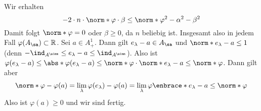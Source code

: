 \begin{beweis}
	Wir erhalten 
	\[
		- 2 \cdot n \cdot \norm*{\varphi} \cdot \beta \le \norm*{\varphi}^2 - \alpha^2 -\beta^2
	\]
	Damit folgt $\norm*{\varphi}= 0$ oder $\beta\ge 0$, da $n$ beliebig ist. 
	Insgesamt also in jedem Fall $\varphi(A_\sa) \subset \mathbb{R}$.
	Sei $a \in A_+^1$. Dann gilt $e_\lambda-a \in A_\sa$ und $\norm*{e_\lambda-a} \le 1$ (denn $- \ind_{A^\simm}\le e_\lambda-a \le \ind_{A^\simm}$).
	Also ist $\varphi(e_\lambda-a) \le \abs*{\varphi(e_\lambda-a)} \le \norm*{\varphi} \cdot \norm*{e_\lambda-a} \le \norm*{\varphi}$.
	Dann gilt aber
	\begin{align}
		\norm*{\varphi}- \varphi(a) = \lim_{\lambda} \varphi(e_\lambda) - \varphi(a) = \lim_\lambda \varphi \enbrace*{e_\lambda-a} \le \norm*{\varphi}
	\end{align}
	Also ist $\varphi(a) \ge 0$ und wir sind fertig.
\end{beweis}


